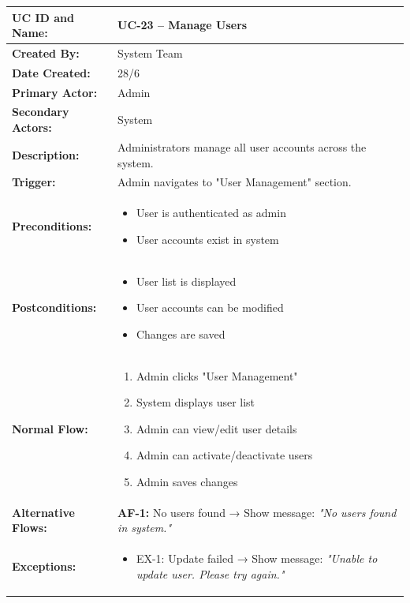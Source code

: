 \documentclass[12pt,a4paper]{article}
\begin{document}
\renewcommand{\arraystretch}{1.5}
\begin{longtable}{|p{4.5cm}|p{10.5cm}|}
\hline
\textbf{UC ID and Name:} & UC-23 – Manage Users \\
\hline
\textbf{Created By:} & System Team \\
\hline
\textbf{Date Created:} & 28/6 \\
\hline
\textbf{Primary Actor:} & Admin \\
\hline
\textbf{Secondary Actors:} & System \\
\hline
\textbf{Description:} & Administrators manage all user accounts across the system. \\
\hline
\textbf{Trigger:} & Admin navigates to "User Management" section. \\
\hline
\textbf{Preconditions:} &
\begin{itemize}
  \item User is authenticated as admin
  \item User accounts exist in system
\end{itemize} \\
\hline
\textbf{Postconditions:} &
\begin{itemize}
  \item User list is displayed
  \item User accounts can be modified
  \item Changes are saved
\end{itemize} \\
\hline
\textbf{Normal Flow:} &
\begin{enumerate}
  \item Admin clicks "User Management"
  \item System displays user list
  \item Admin can view/edit user details
  \item Admin can activate/deactivate users
  \item Admin saves changes
\end{enumerate} \\
\hline
\textbf{Alternative Flows:} &
\textbf{AF-1:} No users found → Show message: \textit{"No users found in system."} \\
\hline
\textbf{Exceptions:} &
\begin{itemize}
  \item EX-1: Update failed → Show message: \textit{"Unable to update user. Please try again."}
\end{itemize} \\
\hline

\end{longtable}
\end{document}
